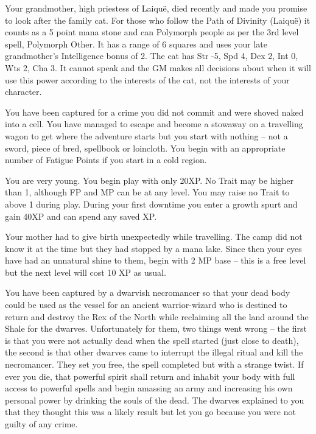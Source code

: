 \begin{multicols}{2}
\begin{list}{\addtocounter{list}{1}\textbf{:}}{\raggedleft}
\item{Your grandmother, high priestess of Laiqu\"{e}, died recently and made you promise to look after the family cat.  For those who follow the Path of Divinity (Laiqu\"{e}) it counts as a 5 point mana stone and can Polymorph people as per the 3rd level spell, Polymorph Other.  It has a range of 6 squares and uses your late grandmother's Intelligence bonus of 2.  The cat has Str -5, Spd 4, Dex 2, Int 0, Wts 2, Cha 3.  It cannot speak and the GM makes all decisions about when it will use this power according to the interests of the cat, not the interests of your character.}

\item{You have been captured for a crime you did not commit and were shoved naked into a cell.  You have managed to escape and become a stowaway on a travelling wagon to get where the adventure starts but you start with nothing -- not a sword, piece of bred, spellbook or loincloth.  You begin with an appropriate number of Fatigue Points if you start in a cold region.}

\item{ You are very young.  You begin play with only 20XP.  No Trait may be higher than 1, although FP and MP can be at any level.  You may raise no Trait to above 1 during play.  During your first downtime you enter a growth spurt and gain 40XP and can spend any saved XP. }

\item{ Your mother had to give birth unexpectedly while travelling.  The camp did not know it at the time but they had stopped by a mana lake.  Since then your eyes have had an unnatural shine to them, begin with 2 MP base -- this is a free level but the next level will cost 10 XP as usual. }

\item{ You have been captured by a dwarvish necromancer so that your dead body could be used as the vessel for an ancient warrior-wizard who is destined to return and destroy the Rex of the North while reclaiming all the land around the Shale for the dwarves.
Unfortunately for them, two things went wrong -- the first is that you were not actually dead when the spell started (just close to death), the second is that other dwarves came to interrupt the illegal ritual and kill the necromancer.
They set you free, the spell completed but with a strange twist.
If ever you die, that powerful spirit shall return and inhabit your body with full access to powerful spells and begin amassing an army and increasing his own personal power by drinking the souls of the dead.
The dwarves explained to you that they thought this was a likely result but let you go because you were not guilty of any crime.}


\end{list}
\end{multicols}
